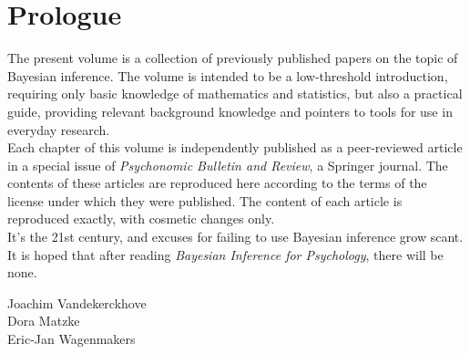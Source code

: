 \chapter*{Prologue}
\thispagestyle{empty}

\noindent The present volume is a collection of previously published papers on the topic of Bayesian inference. The volume is intended to be a low-threshold introduction, requiring only basic knowledge of mathematics and statistics, but also a practical guide, providing relevant background knowledge and pointers to tools for use in everyday research.\\[1ex]

\noindent Each chapter of this volume is independently published as a peer-reviewed article in a special issue of \textit{Psychonomic Bulletin and Review}, a Springer journal. The contents of these articles are reproduced here according to the terms of the license under which they were published. The content of each article is reproduced exactly, with cosmetic changes only.\\[1ex]

\noindent It's the 21st century, and excuses for failing to use Bayesian inference grow scant.  It is hoped that after reading \textit{Bayesian Inference for Psychology}, there will be none.\\[9ex]

\begin{flushright}
Joachim Vandekerckhove\\
Dora Matzke\\
Eric-Jan Wagenmakers
\end{flushright}
